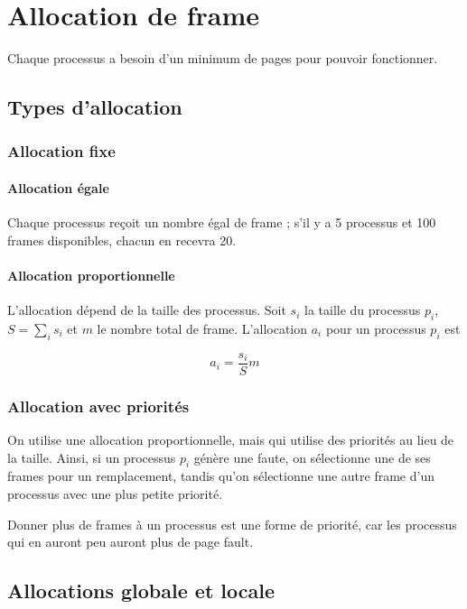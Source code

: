 \section{Allocation de frame}

Chaque processus a besoin d'un minimum de pages pour pouvoir fonctionner.

	\subsection{Types d'allocation}
		\subsubsection{Allocation fixe}
	
			\paragraph{Allocation égale}
		
			Chaque processus reçoit un nombre égal de frame ; s'il y a 5 processus et 100 frames disponibles, chacun en recevra 20.
		
			\paragraph{Allocation proportionnelle}
		
			L'allocation dépend de la taille des processus. Soit $s_i$ la taille du processus $p_i$, $S = \sum_i s_i$ et $m$ le nombre total de frame. L'allocation $a_i$ pour un processus $p_i$ est
		
			$$a_i = \frac{s_i}{S}m$$
				
		\subsubsection{Allocation avec priorités}
	
	On utilise une allocation proportionnelle, mais qui utilise des priorités au lieu de la taille. Ainsi, si un processus $p_i$ génère une faute, on sélectionne une de ses frames pour un remplacement, tandis qu'on sélectionne une autre frame d'un processus avec une plus petite priorité.
	
	Donner plus de frames à un processus est une forme de priorité, car les processus qui en auront peu auront plus de page fault.
	
	\subsection{Allocations globale et locale}
	
